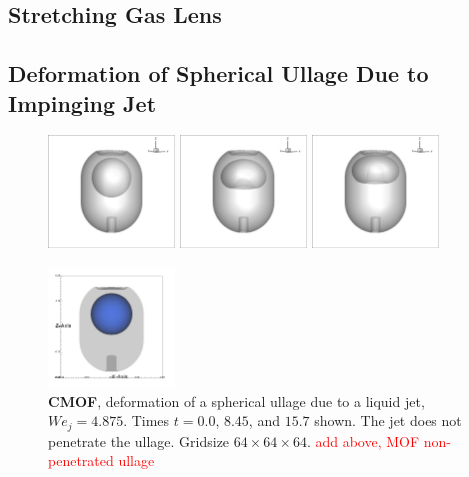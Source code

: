 \documentclass[preprint,12pt]{Definitions/elsarticle}
\begin{document}
\FloatBarrier
\subsection{Stretching Gas Lens}

\FloatBarrier
\subsection{Deformation of Spherical Ullage Due to Impinging Jet}


\begin{figure}[H]
	\centering
	\begin{minipage}[b]{1\linewidth}
		\centering
		\includegraphics[width=0.3\textwidth]{3D_WEJ4p875_0.eps} 
		\includegraphics[width=0.3\textwidth]{3D_WEJ4p875_400.eps} 
		\includegraphics[width=0.3\textwidth]{3D_WEJ4p875_800.eps} 
		\caption{\textbf{CMOF}, deformation of a spherical ullage due to a liquid jet, $We_{j}=4.875$.  
			Times $t=0.0$, $8.45$, and $15.7$ shown.
			The jet does not penetrate the ullage.  Gridsize $64\times 64\times 64$. \textcolor{red}{add above, MOF non-penetrated ullage}}
		\label{3DWEJ4p875cmof}
	\end{minipage}
	\begin{minipage}[b]{1\linewidth}
		\centering
		\includegraphics[width=0.3\textwidth]{PMOFtankNoBreakup/PMOFtankNB_interface0000.png} 

\end{minipage}
\end{figure}
\end{document}
